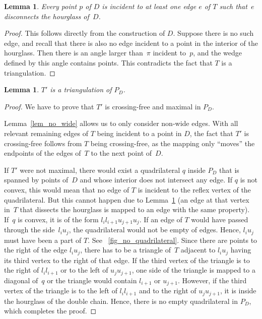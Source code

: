 \documentclass[11pt,a4paper]{article}
\newcommand{\myqed}{\qed}
\renewcommand{\myqed}{}
\newtheorem{lemma}[theorem]{Lemma}
\begin{document}
\begin{lemma}\label{lem_inner_degree}
Every point $p$ of $D$ is incident to at least one edge $e$ of $T$ such that~$e$ disconnects the hourglass of~$D$.
\end{lemma}
\begin{proof}
This follows directly from the construction of $D$.
Suppose there is no such edge, and recall that there is also no edge incident to a point in the interior of the hourglass. Then there is an angle larger than~$\pi$ incident to~$p$, and the wedge defined by this angle contains points.
This contradicts the fact that $T$ is a triangulation.
\myqed
\end{proof}

\begin{lemma}\label{lem_local_triangulation}
$T'$ is a triangulation of $P_D$.
\end{lemma}
\begin{proof}
We have to prove that $T'$ is crossing-free and maximal in $P_D$.

Lemma~\ref{lem_no_wide} allows us to only consider non-wide edges.
With all relevant remaining edges of $T$ being incident to a point in $D$, the fact that $T'$ is crossing-free follows from $T$ being crossing-free, as the mapping only ``moves'' the endpoints of the edges of~$T$ to the next point of~$D$.

If $T'$ were not maximal, there would exist a quadrilateral $q$ inside $P_D$ that is spanned by points of~$D$ and whose interior does not intersect any edge.
If $q$ is not convex, this would mean that no edge of $T$ is incident to the reflex vertex of the quadrilateral.
But this cannot happen due to Lemma~\ref{lem_inner_degree} (an edge at that vertex in~$T$ that dissects the hourglass is mapped to an edge with the same property).
If~$q$ is convex, it is of the form $l_i l_{i+1} u_{j+1} u_j$.
If an edge of $T$ would have passed through the side~$l_i u_j$, the quadrilateral would not be empty of edges.
Hence, $l_i u_j$ must have been a part of $T$.
See \figurename~\ref{fig_no_quadrilateral}.
Since there are points to the right of the edge $l_i u_j$, there has to be a triangle of~$T$ adjacent to $l_i u_j$ having its third vertex to the right of that edge.
If the third vertex of the triangle is to the right of $l_i l_{i+1}$ or to the left of $u_j u_{j+1}$, one side of the triangle is mapped to a diagonal of~$q$ or the triangle would contain $l_{i+1}$ or $u_{j+1}$.
However, if the third vertex of the triangle is to the left of $l_i l_{i+1}$ and to the right of $u_j u_{j+1}$, it is inside the hourglass of the double chain.
Hence, there is no empty quadrilateral in $P_D$, which completes the proof.
\myqed
\end{proof}
\end{document}
